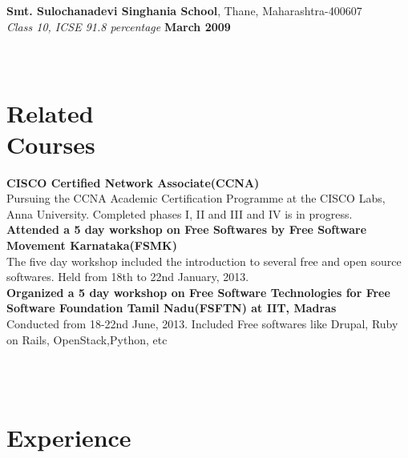 \documentclass[margin,line]{resume}
\begin{document}
\begin{resume}
    \textbf{Smt. Sulochanadevi Singhania School}, Thane, Maharashtra-400607 \vspace{2mm}\\\vspace{1mm}%
    \textsl{Class 10, ICSE 91.8 percentage} \hfill \textbf{March 2009}\vspace{-3mm}\\\vspace{-1mm}%
    \\\\\section{\mysidestyle Related\\Courses} 
    \textbf{CISCO Certified Network Associate(CCNA)} \\Pursuing the CCNA Academic Certification Programme at the CISCO Labs, Anna University. Completed phases I, II and III and IV is in progress. \vspace{2mm}\\\vspace{1mm}%
    \textbf{Attended a 5 day workshop on Free Softwares by Free Software Movement Karnataka(FSMK)}\\The five day workshop included the introduction to several free and open source softwares. Held from 18th to 22nd January, 2013.  \vspace{2mm}\vspace{1mm}%
    \\\textbf{Organized a 5 day workshop on Free Software Technologies for Free Software Foundation Tamil Nadu(FSFTN) at IIT, Madras}\\Conducted from 18-22nd June, 2013. Included Free softwares like Drupal, Ruby on Rails, OpenStack,Python, etc  \vspace{2mm}\vspace{1mm}%

    \\\\\section{\mysidestyle Experience}


\end{resume}
\end{document}
